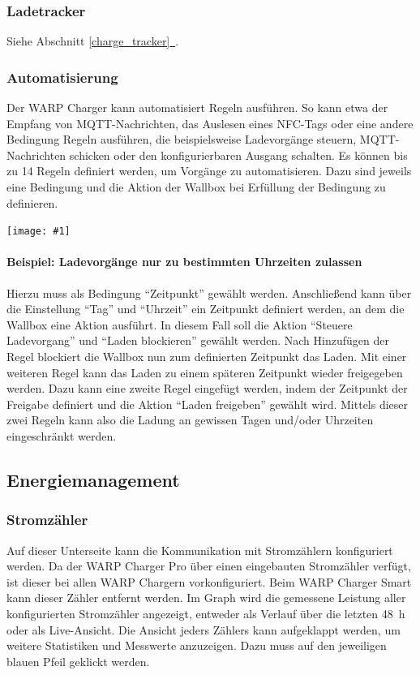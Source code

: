 \documentclass[a4paper,10pt]{article}
\newcommand{\gfx}[1]{\texttt{[image: \#1]}}
\newcommand*{\fullref}[1]{Abschnitt \hyperref[{#1}]{\ref*{#1}~\nameref*{#1}}}
\begin{document}
\begin{multicols*}{2}
    \subsubsection{Ladetracker}
    Siehe \fullref{charge_tracker}.

    \subsubsection{Automatisierung}
    Der WARP Charger kann automatisiert Regeln ausführen. So kann etwa
    der Empfang von MQTT-Nachrichten, das Auslesen eines NFC-Tags oder eine andere Bedingung
    Regeln ausführen, die beispielsweise Ladevorgänge steuern, MQTT-Nachrichten schicken oder
    den konfigurierbaren Ausgang schalten.
    Es können bis zu 14 Regeln definiert werden, um Vorgänge zu automatisieren.
    Dazu sind jeweils eine Bedingung und die Aktion der Wallbox bei Erfüllung der
    Bedingung zu definieren.

    \gfx{./img_warp3/resized/web_automation}

    \paragraph{Beispiel: Ladevorgänge nur zu bestimmten Uhrzeiten zulassen}
    Hierzu muss als Bedingung \enquote{Zeitpunkt} gewählt werden. Anschließend
    kann über die Einstellung \enquote{Tag} und \enquote{Uhrzeit} ein Zeitpunkt definiert werden, an
    dem die Wallbox eine Aktion ausführt. In diesem Fall soll die Aktion
    \enquote{Steuere Ladevorgang} und \enquote{Laden blockieren} gewählt werden. Nach
    Hinzufügen der Regel blockiert die Wallbox nun zum definierten
    Zeitpunkt das Laden. Mit einer weiteren Regel kann
    das Laden zu einem späteren Zeitpunkt wieder freigegeben werden. Dazu kann
    eine zweite Regel eingefügt werden, indem der Zeitpunkt der Freigabe definiert und die Aktion
    \enquote{Laden freigeben} gewählt wird. Mittels dieser zwei Regeln kann also die Ladung
    an gewissen Tagen und/oder Uhrzeiten eingeschränkt werden.


	\subsection{Energiemanagement}\label{energiemanagement}



	\subsubsection{Stromzähler}\label{meter}
    Auf dieser Unterseite kann die Kommunikation mit Stromzählern konfiguriert werden.
    Da der WARP Charger Pro über einen eingebauten Stromzähler verfügt, ist dieser bei allen WARP Chargern vorkonfiguriert.
    Beim WARP Charger Smart kann dieser Zähler entfernt werden.
    Im Graph wird die gemessene Leistung aller konfigurierten Stromzähler
	angezeigt, entweder als Verlauf über die letzten \SI{48}{\hour} oder als
	Live-Ansicht. Die Ansicht jeders Zählers kann aufgeklappt werden, um weitere Statistiken und Messwerte anzuzeigen. Dazu muss auf den
	jeweiligen blauen Pfeil geklickt werden.


\end{multicols*}
\end{document}
